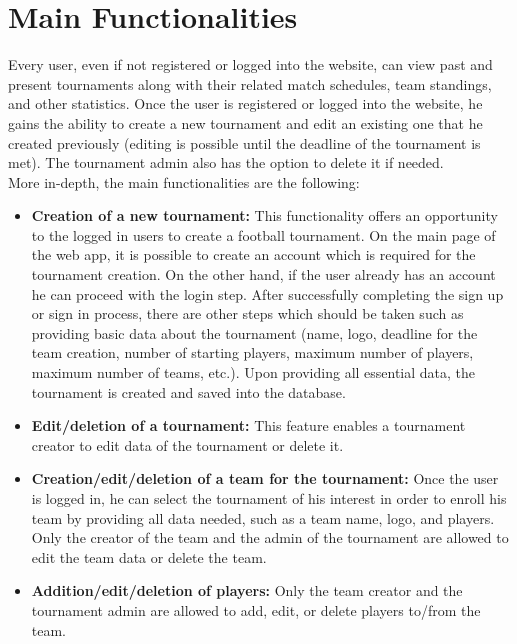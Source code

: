 \section{Main Functionalities}

\noindent Every user, even if not registered or logged into the website, can view past and present tournaments along with their related match schedules, team standings,
and other statistics. Once the user is registered or logged into the website, he gains the ability to create a new  tournament and edit an existing one that he created previously (editing is possible until the deadline of the tournament is met). The tournament admin also has the option to delete it if needed. \\

\noindent More in-depth, the main functionalities are the following:
\begin{itemize}
    \item \textbf{Creation of a new tournament:}
        This functionality offers an opportunity to the logged in users to create a football tournament. On the main page of the web app, it is possible to create an account which is required for the tournament creation. On the other hand, if the user already has an account he can proceed with the login step. After successfully completing the sign up or sign in process, there are other steps which should be taken such as providing basic data about the tournament (name, logo, deadline for the team creation, number of starting players, maximum number of players, maximum number of teams, etc.). Upon providing all essential data, the tournament is created and saved into the database. 
        
        \item \textbf{Edit/deletion of a tournament:}
        This feature enables a tournament creator to edit data of the tournament or delete it.
        
    \item \textbf{Creation/edit/deletion of a team for the tournament:}
        Once the user is logged in, he can select the tournament of his interest in order to enroll his team by providing all data needed, such as a team name, logo, and players. Only the creator of the team and the admin of the tournament are allowed to edit the team data or delete the team.
        
    \item \textbf{Addition/edit/deletion of players:}
        Only the team creator and the tournament admin are allowed to add, edit, or delete players to/from the team.


\end{itemize}
